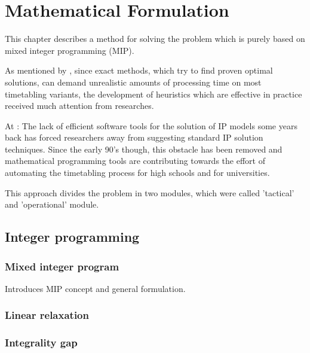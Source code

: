 \chapter{Mathematical Formulation}
\label{chap:mipformulation}



This chapter describes a method for solving the problem which is purely based on mixed integer programming (MIP).

As mentioned by \cite{Haroldo2012}, since exact methods, which try to find proven optimal solutions, can demand unrealistic amounts of processing time on most timetabling variants, the development of heuristics which are effective in practice received much attention from researches.

At \cite{Birbas2009}: The lack of efficient software tools for the solution of IP models some years back has forced researchers away from suggesting standard IP solution techniques. Since the early 90's though, this obstacle has been removed and mathematical programming tools are contributing towards the effort of automating the timetabling process for high schools and for universities.

This approach divides the problem in two modules, which were called 'tactical' and 'operational' module.


\section{Integer programming}


\subsection{Mixed integer program}

Introduces MIP concept and general formulation.


\subsection{Linear relaxation}


\subsection{Integrality gap}


